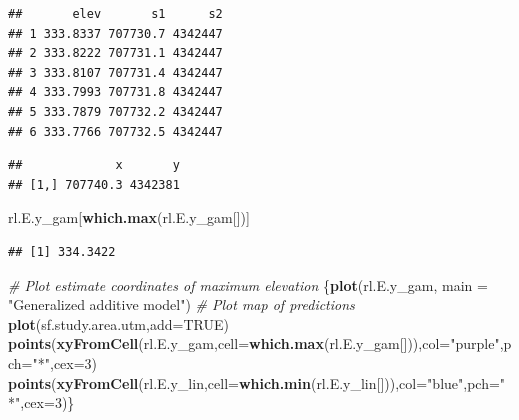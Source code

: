 \documentclass[
]{book}
\newenvironment{Shaded}{\begin{snugshade}}{\end{snugshade}}
\newcommand{\AttributeTok}[1]{\textcolor[rgb]{0.13,0.29,0.53}{#1}}
\newcommand{\CommentTok}[1]{\textcolor[rgb]{0.56,0.35,0.01}{\textit{#1}}}
\newcommand{\ConstantTok}[1]{\textcolor[rgb]{0.56,0.35,0.01}{#1}}
\newcommand{\DecValTok}[1]{\textcolor[rgb]{0.00,0.00,0.81}{#1}}
\newcommand{\FunctionTok}[1]{\textcolor[rgb]{0.13,0.29,0.53}{\textbf{#1}}}
\newcommand{\NormalTok}[1]{#1}
\newcommand{\OtherTok}[1]{\textcolor[rgb]{0.56,0.35,0.01}{#1}}
\newcommand{\SpecialCharTok}[1]{\textcolor[rgb]{0.81,0.36,0.00}{\textbf{#1}}}
\newcommand{\StringTok}[1]{\textcolor[rgb]{0.31,0.60,0.02}{#1}}
\begin{document}
\begin{verbatim}
##       elev       s1      s2
## 1 333.8337 707730.7 4342447
## 2 333.8222 707731.1 4342447
## 3 333.8107 707731.4 4342447
## 4 333.7993 707731.8 4342447
## 5 333.7879 707732.2 4342447
## 6 333.7766 707732.5 4342447
\end{verbatim}

\begin{Shaded}
\end{Shaded}

\begin{verbatim}
##             x       y
## [1,] 707740.3 4342381
\end{verbatim}

\begin{Shaded}
\begin{Highlighting}[]
\NormalTok{rl.E.y\_gam[}\FunctionTok{which.max}\NormalTok{(rl.E.y\_gam[])]}
\end{Highlighting}
\end{Shaded}

\begin{verbatim}
## [1] 334.3422
\end{verbatim}

\begin{Shaded}
\begin{Highlighting}[]
\CommentTok{\# Plot estimate coordinates of maximum elevation}
\NormalTok{\{}\FunctionTok{plot}\NormalTok{(rl.E.y\_gam, }\AttributeTok{main =} \StringTok{"Generalized additive model"}\NormalTok{) }\CommentTok{\# Plot map of predictions}
\FunctionTok{plot}\NormalTok{(sf.study.area.utm,}\AttributeTok{add=}\ConstantTok{TRUE}\NormalTok{)}
\FunctionTok{points}\NormalTok{(}\FunctionTok{xyFromCell}\NormalTok{(rl.E.y\_gam,}\AttributeTok{cell=}\FunctionTok{which.max}\NormalTok{(rl.E.y\_gam[])),}\AttributeTok{col=}\StringTok{"purple"}\NormalTok{,}\AttributeTok{pch=}\StringTok{"*"}\NormalTok{,}\AttributeTok{cex=}\DecValTok{3}\NormalTok{)}
\FunctionTok{points}\NormalTok{(}\FunctionTok{xyFromCell}\NormalTok{(rl.E.y\_lin,}\AttributeTok{cell=}\FunctionTok{which.min}\NormalTok{(rl.E.y\_lin[])),}\AttributeTok{col=}\StringTok{"blue"}\NormalTok{,}\AttributeTok{pch=}\StringTok{"*"}\NormalTok{,}\AttributeTok{cex=}\DecValTok{3}\NormalTok{)\}}
\end{Highlighting}
\end{Shaded}
\end{document}
